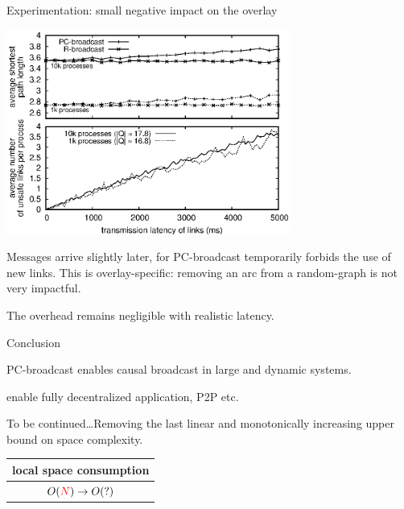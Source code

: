 \documentclass[10pt, xcolor={usenames, dvipsnames}]{beamer}
\newcommand{\NO}[1]{\textcolor{red}{#1}}
\begin{document}
\begin{frame}{Experimentation: small negative impact on the overlay}

  \begin{center}
    \includegraphics[width=0.7\textwidth]{img/delay.eps}
  \end{center}
  
  \vspace{-5pt}

  \small Messages arrive slightly later, for PC-broadcast temporarily forbids the use
  of new links. This is overlay-specific: removing an arc from a random-graph is
  not very impactful.

  The overhead remains negligible with realistic latency.

\end{frame}

\begin{frame}{Conclusion}
  
  PC-broadcast enables causal broadcast in large and dynamic systems. 

  enable fully decentralized application, P2P etc.

  \vspace{2em}

  \begin{center}
  \begin{table}
    \begin{center}
      
    \end{center}
  \end{table}
  \end{center}


\end{frame}

\begin{frame}[standout]
  To be continued\ldots Removing the last linear and monotonically increasing upper bound on space complexity.
  
  \vspace{2em}
  
  \small 
  \begin{table}
    \begin{tabularx}{0.312\columnwidth}{@{}c@{}}
      local space consumption \\
      \hline\hline
      $O(\NO{N}) \rightarrow O(?)$
    \end{tabularx}
  \end{table}
  
\end{frame}
\end{document}
